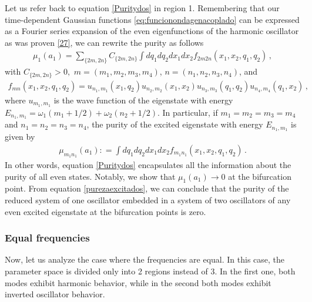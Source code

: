 \documentclass[12pt]{iopart}
\begin{document}
Let us refer back to equation \eqref{Puritydos} in region 1. Remembering that our time-dependent Gaussian functions \eqref{eq:funcionondagenacoplado} can be expressed as a Fourier series expansion of the even eigenfunctions of the harmonic oscillator as was proven \eqref{27}, we can rewrite the purity as follows
\begin{align}
\label{generadora}
   \mu_1(a_1)=\!\!\!\!\!\sum_{\{ 2m,2n\} } \!\!\!\!\!C_{\{2m,2n\}}\!\!\! \int \!\! dq_1 dq_2 dx_1 dx_2 f_{2m2n}(x_1,x_2,q_1,q_2) \,,
\end{align}
with $C_{\{2m,2n\}}>0,$ $m=(m_1,m_2, m_3,m_4)$,  $n=(n_1,n_2, n_3,n_4)$, and
\begin{align}
     f_{mn}(x_1,x_2,q_1,q_2)= u_{n_1,m_1}(x_1,q_2)u_{n_2,m_2}(x_1,x_2)u_{n_3,m_3}(q_1,q_2)u_{n_4,m_4}(q_1,x_2)\,,
\end{align}
where $u_{m_1,m_1}$ is the wave function of the eigenstate with energy $E_{n_1,m_1}=\omega_1( m_1+1/2)+\omega_2(n_2+1/2)$. In particular, if $m_1=m_2=m_3=m_4$ and $n_1=n_2=n_3=n_4$, the purity of the excited eigenstate with energy $E_{n_1,m_1}$ is given by
\begin{align}
\label{purezaexcitados}
\mu_{m_1n_1} (a_1) : =   \int dq_1 dq_2 dx_1 dx_2 f_{m_1 n_1}(x_1,x_2,q_1,q_2)\,.
\end{align}
In other words, equation \eqref{Puritydos} encapsulates all the information about the purity of all even states. Notably, we show that $\mu_1(a_1)\to 0$ at the bifurcation point. From equation \eqref{purezaexcitados}, we can conclude that the purity of the reduced system of one oscillator embedded in a system of two oscillators of any even excited eigenstate at the bifurcation points is zero. 


\subsubsection{Equal frequencies}

Now, let us analyze the case where the frequencies are equal. In this case, the parameter space is divided only into 2 regions instead of 3. In the first one, both modes exhibit harmonic behavior, while in the second both modes exhibit inverted oscillator behavior.
\end{document}
